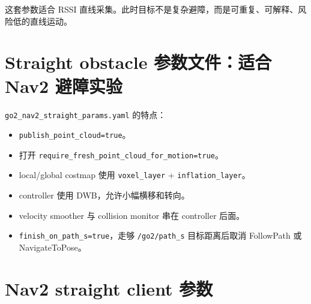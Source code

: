 \documentclass[UTF8,11pt,a4paper,openany]{ctexrep}
\newcommand{\topic}[1]{\nolinkurl{#1}}
\newcommand{\param}[1]{\nolinkurl{#1}}
\newcommand{\file}[1]{\nolinkurl{#1}}
\begin{document}
这套参数适合 RSSI 直线采集。此时目标不是复杂避障，而是可重复、可解释、风险低的直线运动。

\section{Straight obstacle 参数文件：适合 Nav2 避障实验}

\file{go2_nav2_straight_params.yaml} 的特点：

\begin{itemize}
  \item \param{publish_point_cloud=true}。
  \item 打开 \param{require_fresh_point_cloud_for_motion=true}。
  \item local/global costmap 使用 \param{voxel_layer} + \param{inflation_layer}。
  \item controller 使用 DWB，允许小幅横移和转向。
  \item velocity smoother 与 collision monitor 串在 controller 后面。
  \item \param{finish_on_path_s=true}，走够 \topic{/go2/path_s} 目标距离后取消 FollowPath 或 NavigateToPose。
\end{itemize}

\section{Nav2 straight client 参数}
\end{document}
